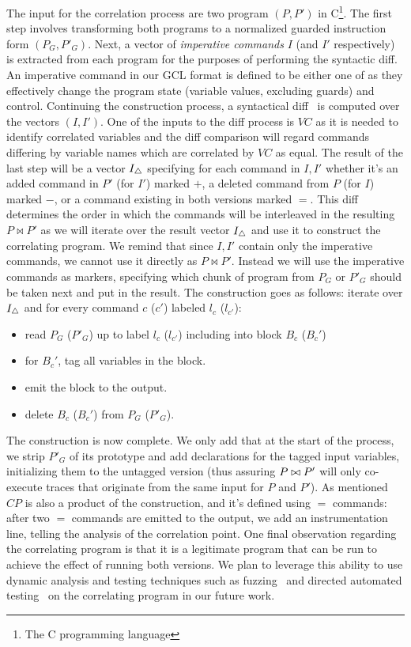 The input for the correlation process are two program $(P,P')$ in C\footnote{The C programming language}. The first step involves transforming both programs to a normalized guarded instruction form $(P_{G},P'_{G})$. Next, a vector of \emph{imperative commands} $I$ (and $I'$ respectively) is extracted from each program for the purposes of performing the syntactic diff. An imperative command in our GCL format is defined to be either one of  as they effectively change the program state (variable values, excluding guards) and control.  Continuing the construction process, a syntactical diff~\cite{HuntMcIlroy75} is computed over the vectors $(I,I')$. One of the inputs to the diff process is $VC$ as it is needed to identify correlated variables and the diff comparison will regard commands differing by variable names which are correlated by $VC$ as equal. The result of the last step will be a vector $I_{\triangle}$ specifying for each command in $I,I'$ whether it's an added command in $P'$ (for $I'$) marked $+$, a deleted command from $P$ (for $I$) marked $-$, or a command existing in both versions marked $=$. This diff determines the order in which the commands will be interleaved in the resulting $P \bowtie P'$ as we will iterate over the result vector $I_{\triangle}$ and use it to construct the correlating program. We remind that since $I,I'$ contain only the imperative commands, we cannot use it directly as $P \bowtie P'$. Instead we will use the imperative commands as markers, specifying which chunk of program from $P_G$ or $P'_G$ should be taken next and put in the result. The construction goes as follows: iterate over $I_{\triangle}$ and for every command $c$ ($c'$) labeled $l_c$ ($l_{c'}$):
\begin{itemize}
\item read $P_G$ ($P'_G$) up to label $l_c$ ($l_{c'}$) including into block $B_c$ ($B_c'$)
\item for $B_c'$, tag all variables in the block.
\item emit the block to the output.
\item delete $B_c$ ($B_c'$) from $P_G$ ($P'_G$).
\end{itemize}
The construction is now complete. We only add that at the start of the process, we strip $P'_G$ of its prototype and add declarations for the tagged input variables, initializing them to the untagged version (thus assuring $P \bowtie P'$ will only co-execute traces that originate from the same input for $P$ and $P'$).
As mentioned $CP$ is also a product of the construction, and it's defined using $=$ commands: after two $=$ commands are emitted to the output, we add an instrumentation line, telling the analysis of the correlation point.
One final observation regarding the correlating program is that it is a legitimate program that can be run to achieve the effect of running both versions. We plan to leverage this ability to use dynamic analysis and testing techniques such as fuzzing~\cite{NethercoteSeward07} and directed automated testing~\cite{CadarDunbarEngler08} on the correlating program in our future work.
